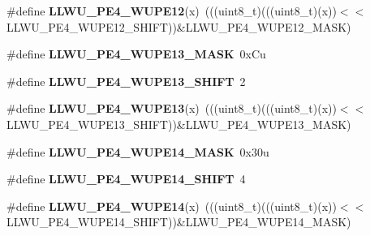 \begin{DoxyCompactItemize}
\item 
\#define {\bfseries L\+L\+W\+U\+\_\+\+P\+E4\+\_\+\+W\+U\+P\+E12}(x)~(((uint8\+\_\+t)(((uint8\+\_\+t)(x))$<$$<$L\+L\+W\+U\+\_\+\+P\+E4\+\_\+\+W\+U\+P\+E12\+\_\+\+S\+H\+I\+FT))\&L\+L\+W\+U\+\_\+\+P\+E4\+\_\+\+W\+U\+P\+E12\+\_\+\+M\+A\+SK)\hypertarget{group__LLWU__Register__Masks_ga433532e85a0db075b0e525c1483a27ad}{}\label{group__LLWU__Register__Masks_ga433532e85a0db075b0e525c1483a27ad}

\item 
\#define {\bfseries L\+L\+W\+U\+\_\+\+P\+E4\+\_\+\+W\+U\+P\+E13\+\_\+\+M\+A\+SK}~0x\+Cu\hypertarget{group__LLWU__Register__Masks_ga4d9218c37bd27ed586a5e73aa1b20a84}{}\label{group__LLWU__Register__Masks_ga4d9218c37bd27ed586a5e73aa1b20a84}

\item 
\#define {\bfseries L\+L\+W\+U\+\_\+\+P\+E4\+\_\+\+W\+U\+P\+E13\+\_\+\+S\+H\+I\+FT}~2\hypertarget{group__LLWU__Register__Masks_ga176680468b0cf75fbccc4a8be5d45388}{}\label{group__LLWU__Register__Masks_ga176680468b0cf75fbccc4a8be5d45388}

\item 
\#define {\bfseries L\+L\+W\+U\+\_\+\+P\+E4\+\_\+\+W\+U\+P\+E13}(x)~(((uint8\+\_\+t)(((uint8\+\_\+t)(x))$<$$<$L\+L\+W\+U\+\_\+\+P\+E4\+\_\+\+W\+U\+P\+E13\+\_\+\+S\+H\+I\+FT))\&L\+L\+W\+U\+\_\+\+P\+E4\+\_\+\+W\+U\+P\+E13\+\_\+\+M\+A\+SK)\hypertarget{group__LLWU__Register__Masks_ga0f97d1fbb1fd4c3be4a4641755e8b7a9}{}\label{group__LLWU__Register__Masks_ga0f97d1fbb1fd4c3be4a4641755e8b7a9}

\item 
\#define {\bfseries L\+L\+W\+U\+\_\+\+P\+E4\+\_\+\+W\+U\+P\+E14\+\_\+\+M\+A\+SK}~0x30u\hypertarget{group__LLWU__Register__Masks_gae3a1e7b7497f719cfebd559f31dc4d07}{}\label{group__LLWU__Register__Masks_gae3a1e7b7497f719cfebd559f31dc4d07}

\item 
\#define {\bfseries L\+L\+W\+U\+\_\+\+P\+E4\+\_\+\+W\+U\+P\+E14\+\_\+\+S\+H\+I\+FT}~4\hypertarget{group__LLWU__Register__Masks_ga1942d07f99eb5afb836650dcfb2185af}{}\label{group__LLWU__Register__Masks_ga1942d07f99eb5afb836650dcfb2185af}

\item 
\#define {\bfseries L\+L\+W\+U\+\_\+\+P\+E4\+\_\+\+W\+U\+P\+E14}(x)~(((uint8\+\_\+t)(((uint8\+\_\+t)(x))$<$$<$L\+L\+W\+U\+\_\+\+P\+E4\+\_\+\+W\+U\+P\+E14\+\_\+\+S\+H\+I\+FT))\&L\+L\+W\+U\+\_\+\+P\+E4\+\_\+\+W\+U\+P\+E14\+\_\+\+M\+A\+SK)\hypertarget{group__LLWU__Register__Masks_ga376a97009729f8dde435a783deb148d8}{}\label{group__LLWU__Register__Masks_ga376a97009729f8dde435a783deb148d8}


\end{DoxyCompactItemize}
